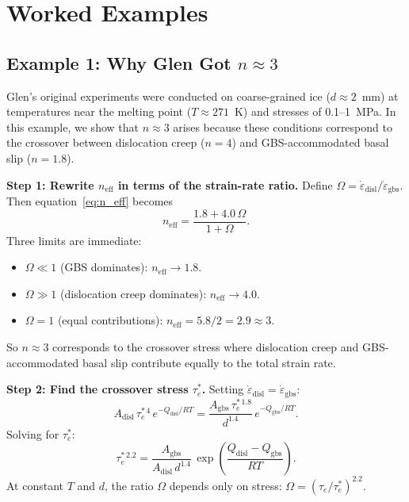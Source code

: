 \documentclass[11pt]{article}
\begin{document}
\section{Worked Examples}
\label{sec:worked_examples}

\subsection{Example 1: Why Glen Got $n \approx 3$}
\label{sec:example_glen_n3}

Glen's original experiments were conducted on coarse-grained ice ($d \approx 2$~mm) at temperatures near the melting point ($T \approx 271$~K) and stresses of 0.1--1~MPa.  In this example, we show that $n \approx 3$ arises because these conditions correspond to the crossover between dislocation creep ($n = 4$) and GBS-accommodated basal slip ($n = 1.8$).

\medskip
\noindent\textbf{Step 1: Rewrite $n_{\text{eff}}$ in terms of the strain-rate ratio.}  Define $\Omega = \dot{\varepsilon}_{\text{disl}} / \dot{\varepsilon}_{\text{gbs}}$.  Then equation~\eqref{eq:n_eff} becomes
\begin{equation}
  n_{\text{eff}} = \frac{1.8 + 4.0\,\Omega}{1 + \Omega}.
  \label{eq:n_eff_ratio}
\end{equation}
Three limits are immediate:
\begin{itemize}
  \item $\Omega \ll 1$ (GBS dominates): $n_{\text{eff}} \to 1.8$.
  \item $\Omega \gg 1$ (dislocation creep dominates): $n_{\text{eff}} \to 4.0$.
  \item $\Omega = 1$ (equal contributions): $n_{\text{eff}} = 5.8/2 = 2.9 \approx 3$.
\end{itemize}
So $n \approx 3$ corresponds to the crossover stress where dislocation creep and GBS-accommodated basal slip contribute equally to the total strain rate.

\medskip
\noindent\textbf{Step 2: Find the crossover stress $\tau_e^*$.}  Setting $\dot{\varepsilon}_{\text{disl}} = \dot{\varepsilon}_{\text{gbs}}$:
\begin{equation}
  A_{\text{disl}}\,\tau_e^{*\,4}\,e^{-Q_{\text{disl}}/RT} = \frac{A_{\text{gbs}}\,\tau_e^{*\,1.8}}{d^{1.4}}\,e^{-Q_{\text{gbs}}/RT}.
\end{equation}
Solving for $\tau_e^*$:
\begin{equation}
  \tau_e^{*\,2.2} = \frac{A_{\text{gbs}}}{A_{\text{disl}}\,d^{1.4}}\,\exp\!\left(\frac{Q_{\text{disl}} - Q_{\text{gbs}}}{RT}\right).
  \label{eq:crossover_stress}
\end{equation}
At constant $T$ and $d$, the ratio $\Omega$ depends only on stress: $\Omega = (\tau_e / \tau_e^*)^{2.2}$.
\end{document}
